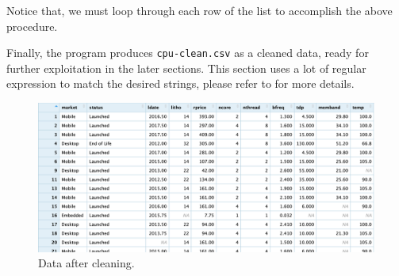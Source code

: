Notice that, we must loop through each row of the list to accomplish the above procedure.

Finally, the program produces \verb|cpu-clean.csv| as a cleaned data, ready for further exploitation in the later sections. This section uses a lot of regular expression
to match the desired strings, please refer to  for more details.

\begin{figure}[H]
    \centering
    \includegraphics[max width=0.9\linewidth]{./graphics/cleaned_data.png}
    \caption{Data after cleaning.}
\end{figure}

